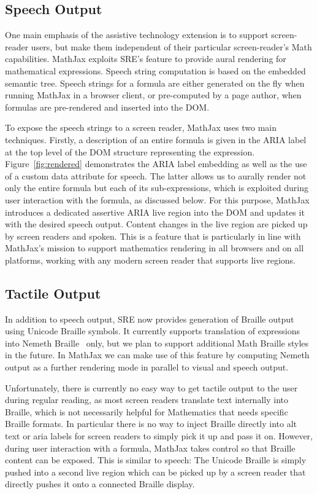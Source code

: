 \documentclass{sig-alternate}
\begin{document}
\subsection{Speech Output}

One main emphasis of the assistive technology extension is to support
screen-reader users, but make them independent of their particular
screen-reader's Math capabilities. MathJax exploits SRE's feature to provide
aural rendering for mathematical expressions. Speech string computation is based
on the embedded semantic tree. Speech strings for a formula are either generated
on the fly when running MathJax in a browser client, or pre-computed by a page
author, when formulas are pre-rendered and inserted into the DOM.

To expose the speech strings to a screen reader, MathJax uses two main
techniques.  Firstly, a description of an entire formula is given in the ARIA
label at the top level of the DOM structure representing the expression.
Figure~\ref{fig:rendered} demonstrates the ARIA label embedding as well as the
use of a custom data attribute for speech. The latter allows us to aurally
render not only the entire formula but each of its sub-expressions, which is
exploited during user interaction with the formula, as discussed below.  For
this purpose, MathJax introduces a dedicated assertive ARIA live region into the
DOM and updates it with the desired speech output. Content changes in the live region
are picked up by screen readers and spoken. This is a feature that is
particularly in line with MathJax's mission to support mathematics
rendering in all browsers and on all platforms, working with any modern screen
reader that supports live regions.


\subsection{Tactile Output}

In addition to speech output, SRE now provides generation of Braille
output using Unicode Braille symbols. It currently supports translation of
expressions into Nemeth Braille~\cite{nemeth1972nemeth} only, but we plan to support
additional Math Braille styles in the future. In MathJax we can make use of this
feature by computing Nemeth output as a further rendering mode in parallel to
visual and speech output.

Unfortunately, there is currently no easy way to get tactile output to the user
during regular reading, as most screen readers translate text internally into
Braille, which is not necessarily helpful for Mathematics that needs specific
Braille formats. In particular there is no way to inject Braille directly into
alt text or aria labels for screen readers to simply pick it up and pass it on.
However, during user interaction with a formula, MathJax takes control so that
Braille content can be exposed. This is similar to speech: The Unicode Braille
is simply pushed into a second live region which can be picked up by a screen
reader that directly pushes it onto a connected Braille display.
\end{document}
